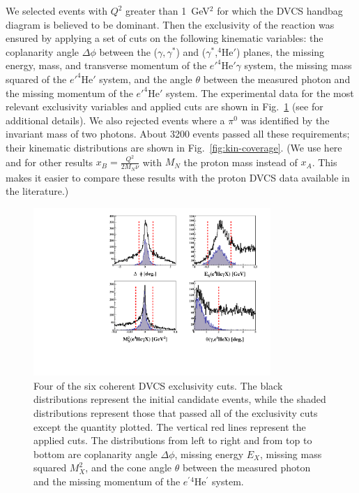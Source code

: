 \documentclass[twocolumn,nofootinbib,prl,superscriptaddress,secnumarabic,amssymb,nobibnotes,aps,floatfix]{revtex4}
\begin{document}
We selected events with $Q^{2}$ greater than 1~GeV$^{2}$ for which the DVCS handbag 
diagram is believed to be dominant. Then the exclusivity of the reaction was ensured by 
applying a set of cuts on the following kinematic variables: the coplanarity 
angle $\Delta\phi$ between the ($\gamma,\gamma^*$) 
and ($\gamma^*$,$^4$He$'$) planes, the missing energy, mass, and transverse
momentum of the $e'^4$He$'\gamma$ system, the missing mass squared of the 
$e'^4$He$'$ system, and the angle $\theta$ between the measured photon and the 
missing momentum of the $e'^4$He$'$ system. The experimental data for the most 
relevant exclusivity variables and applied cuts are shown in 
Fig.~\ref{fig:kin-cuts} (see \cite{Hattawy:thesis} for additional details). We 
also rejected events where a $\pi^0$ was identified by the invariant mass of 
two photons. About 3200 events passed all these requirements; their kinematic 
distributions are shown in Fig.~\ref{fig:kin-coverage}. (We use here and for 
other results $x_B =\frac{Q^2}{2M_N\nu}$ with $M_N$ the proton mass instead of 
$x_A$. This makes it easier to compare these results with the proton DVCS data
available in the literature.) 

\begin{figure}[tb]
\centering
\hspace{-0.45cm}
\includegraphics[width=9cm]{F_all_coh_exc_cuts-pub.pdf}
\caption{Four of the six coherent DVCS exclusivity cuts. The black 
distributions represent the initial candidate events, while the shaded 
distributions represent those that passed all of the exclusivity cuts except 
the quantity plotted. The vertical red lines represent the applied cuts.
The distributions from left to right and from top to bottom are coplanarity 
angle $\Delta \phi$, missing energy $E_X$, missing mass squared $M_X^2$, and 
the cone angle $\theta$ between the measured photon and the missing momentum of 
the $e^\prime{^4}$He$^\prime$ system.}
\label{fig:kin-cuts}
\end{figure}
 
\end{document}
